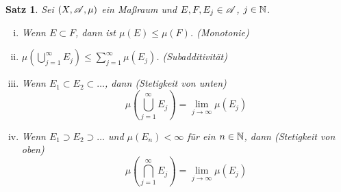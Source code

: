 \documentclass[
 a4paper,
 12pt,
 parskip=half
 ]{scrreprt}
\theoremstyle{plain}
\newtheorem{thm}{Satz}[section] %
\theoremstyle{definition}
\numberwithin{equation}{section}
\begin{document}
\begin{thm}
 Sei $(X, \mathscr{A}, \mu)$ ein Maßraum und $E, F, E_j \in \mathscr{A}$, $j \in \mathbb{N}$. 
 \begin{enumerate}[(i)]
  \item Wenn $E \subset F$, dann ist $\mu(E) \le \mu(F)$. \hfill \emph{(Monotonie)}
  \item $\mu \left( \bigcup_{j=1}^\infty E_j \right) \le \sum_{j=1}^\infty \mu(E_j)$. \hfill \emph{(Subadditivität)}
  \item Wenn $E_1 \subset E_2 \subset \ldots$, dann \hfill \emph{(Stetigkeit von unten)}
   \[ \mu \left( \bigcup_{j=1}^\infty E_j \right) = \lim_{j \to \infty} \mu( E_j )  \]
  \item Wenn $E_1 \supset E_2 \supset \ldots$ und $\mu(E_n) < \infty$ für ein $n \in \mathbb{N}$, dann \hfill \emph{(Stetigkeit von oben)}
   \[ \mu \left( \bigcap_{j=1}^\infty E_j \right) = \lim_{j \to \infty} \mu( E_j )  \]
 \end{enumerate}
\end{thm}
\end{document}
